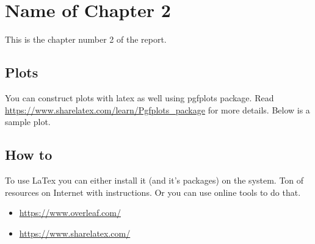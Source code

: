 \chapter{Name of Chapter 2}\label{ch:chapter_2}
This is the chapter number 2 of the report.

\section{Plots}
You can construct plots with latex as well using pgfplots package. Read \url{https://www.sharelatex.com/learn/Pgfplots_package} for more details. Below is a sample plot.

\begin{figure}[ht]
  \centering
\end{figure}

\section{How to}
To use LaTex you can either install it (and it's packages) on the system. Ton of resources on Internet with instructions. Or you can use online tools to do that.
\begin{itemize}
\item \url{https://www.overleaf.com/}
\item \url{https://www.sharelatex.com/}
\end{itemize}
